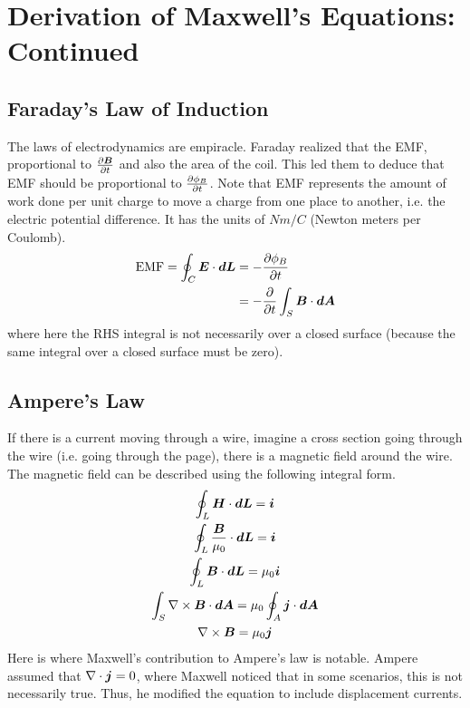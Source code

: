 \documentclass{article}
\begin{document}
\section{Derivation of Maxwell's Equations: Continued}

\subsection{Faraday's Law of Induction}
    
The laws of electrodynamics are empiracle. Faraday realized that the EMF,
proportional to $\frac{\partial \boldsymbol{B}}{\partial t}$ and also the area of the coil. This led them to
deduce that EMF should be proportional to $\frac{\partial \phi_B}{\partial t}$. Note that EMF
represents the amount of work done per unit charge to move a charge from one
place to another, i.e. the electric potential difference. It has the units of
$Nm/C$ (Newton meters per Coulomb). 
\begin{align*}
    \text{EMF} = \oint_C\boldsymbol{E}\cdot\boldsymbol{dL} &= - \frac{\partial \phi_B}{\partial t} \\
    &= -\frac{\partial }{\partial t}\int_S\boldsymbol{B}\cdot\boldsymbol{dA}
\end{align*}
where here the RHS integral is not necessarily over a closed surface (because
the same integral over a closed surface must be zero). 

\subsection{Ampere's Law}

If there is a current moving through a wire, imagine a cross section going
through the wire (i.e. going through the page), there is a magnetic field around
the wire. The magnetic field can be described using the following integral form. 
\begin{gather*}
    \oint_L \boldsymbol{H}\cdot\boldsymbol{dL} = \boldsymbol{i}\\
    \oint_L\frac{\boldsymbol{B}}{\mu_0}\cdot\boldsymbol{dL} = \boldsymbol{i}\\
    \oint_L\boldsymbol{B}\cdot\boldsymbol{dL} = \mu_0\boldsymbol{i}\\
    \int_S\nabla\times\boldsymbol{B}\cdot\boldsymbol{dA} = \mu_0\oint_A\boldsymbol{j}\cdot\boldsymbol{dA}\\
    \nabla\times\boldsymbol{B} = \mu_0\boldsymbol{j}
\end{gather*}
Here is where Maxwell's contribution to Ampere's law is notable. Ampere assumed
that $\nabla \cdot{\boldsymbol{j}} = 0$, where Maxwell noticed that in some scenarios, this
is not necessarily true. Thus, he modified the equation to include displacement
currents. 
\end{document}
